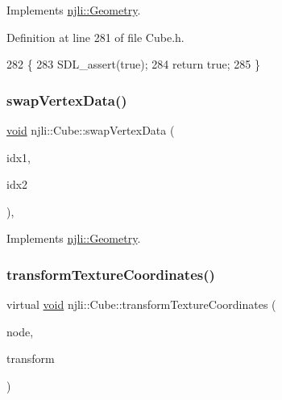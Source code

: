 Implements \mbox{\hyperlink{classnjli_1_1_geometry_a9d2e2064f925d9be17ed7fb1b84b728a}{njli\+::\+Geometry}}.



Definition at line 281 of file Cube.\+h.


\begin{DoxyCode}
282     \{
283       SDL\_assert(\textcolor{keyword}{true});
284       \textcolor{keywordflow}{return} \textcolor{keyword}{true};
285     \}
\end{DoxyCode}
\mbox{\label{classnjli_1_1_cube_af902a20050d40c642b6c5e7def28cce0}} 
\subsubsection{\texorpdfstring{swap\+Vertex\+Data()}{swapVertexData()}}
{\footnotesize\ttfamily \mbox{\hyperlink{_thread_8h_af1e856da2e658414cb2456cb6f7ebc66}{void}} njli\+::\+Cube\+::swap\+Vertex\+Data (\begin{DoxyParamCaption}\item[{const size\+\_\+t}]{idx1,  }\item[{const size\+\_\+t}]{idx2 }\end{DoxyParamCaption})\hspace{0.3cm}{\ttfamily [protected]}, {\ttfamily [virtual]}}



Implements \mbox{\hyperlink{classnjli_1_1_geometry_ac7ee1093062d2f342519f7914852a367}{njli\+::\+Geometry}}.

\mbox{\label{classnjli_1_1_cube_af656eb95de72d96c48d9be85d3801763}} 
\subsubsection{\texorpdfstring{transform\+Texture\+Coordinates()}{transformTextureCoordinates()}}
{\footnotesize\ttfamily virtual \mbox{\hyperlink{_thread_8h_af1e856da2e658414cb2456cb6f7ebc66}{void}} njli\+::\+Cube\+::transform\+Texture\+Coordinates (\begin{DoxyParamCaption}\item[{\mbox{\hyperlink{classnjli_1_1_node}{Node}} $\ast$}]{node,  }\item[{const bt\+Transform \&}]{transform }\end{DoxyParamCaption})\hspace{0.3cm}{\ttfamily [virtual]}}

